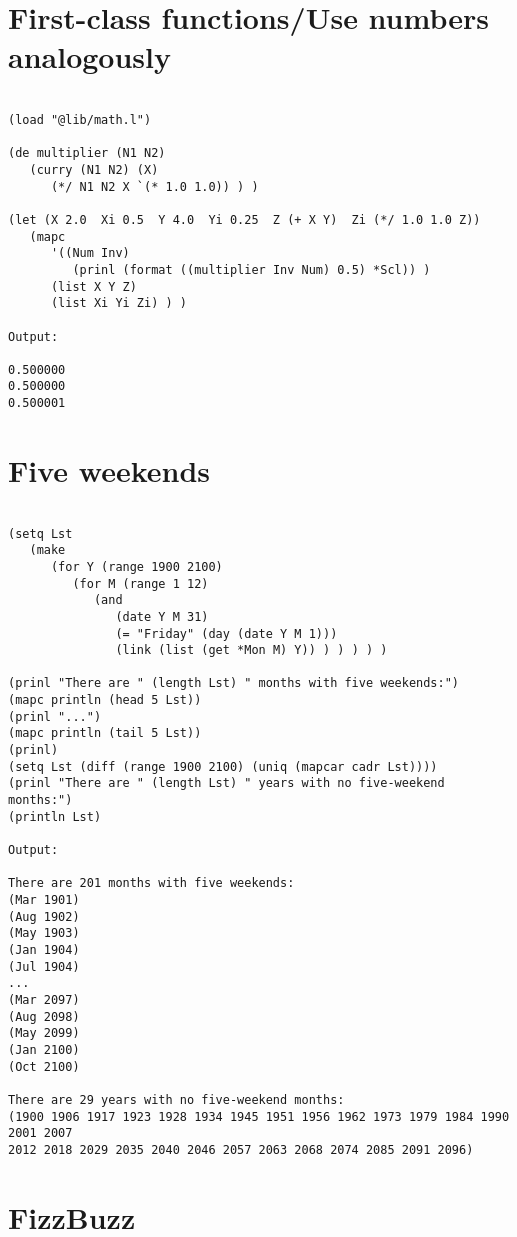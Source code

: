 \section*{First-class functions/Use numbers analogously}

\begin{verbatim}

(load "@lib/math.l")

(de multiplier (N1 N2)
   (curry (N1 N2) (X)
      (*/ N1 N2 X `(* 1.0 1.0)) ) )

(let (X 2.0  Xi 0.5  Y 4.0  Yi 0.25  Z (+ X Y)  Zi (*/ 1.0 1.0 Z))
   (mapc
      '((Num Inv)
         (prinl (format ((multiplier Inv Num) 0.5) *Scl)) )
      (list X Y Z)
      (list Xi Yi Zi) ) )

Output:

0.500000
0.500000
0.500001

\end{verbatim}

\section*{Five weekends}

\begin{verbatim}

(setq Lst
   (make
      (for Y (range 1900 2100)
         (for M (range 1 12)
            (and
               (date Y M 31)
               (= "Friday" (day (date Y M 1)))
               (link (list (get *Mon M) Y)) ) ) ) ) )

(prinl "There are " (length Lst) " months with five weekends:")
(mapc println (head 5 Lst))
(prinl "...")
(mapc println (tail 5 Lst))
(prinl)
(setq Lst (diff (range 1900 2100) (uniq (mapcar cadr Lst))))
(prinl "There are " (length Lst) " years with no five-weekend months:")
(println Lst)

Output:

There are 201 months with five weekends:
(Mar 1901)
(Aug 1902)
(May 1903)
(Jan 1904)
(Jul 1904)
...
(Mar 2097)
(Aug 2098)
(May 2099)
(Jan 2100)
(Oct 2100)

There are 29 years with no five-weekend months:
(1900 1906 1917 1923 1928 1934 1945 1951 1956 1962 1973 1979 1984 1990 2001 2007
2012 2018 2029 2035 2040 2046 2057 2063 2068 2074 2085 2091 2096)

\end{verbatim}

\section*{FizzBuzz}

